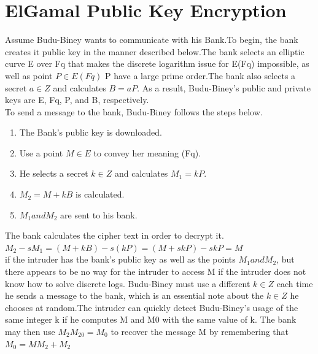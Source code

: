 \section{ElGamal Public Key Encryption}
Assume Budu-Biney wants to communicate with his Bank.To begin, the bank creates it public key in the manner described below.The bank selects an elliptic curve E over Fq that makes the discrete logarithm issue for E(Fq) impossible, as well as  point $P \in E(Fq)$ P have a large prime order.The bank also selects a secret $a \in Z$ and calculates $B = aP$. As a result, Budu-Biney's public and private keys are E, Fq, P, and B, respectively.\\To send a message to the bank, Budu-Biney follows the steps below.
\begin{enumerate}
\item The Bank's public key is downloaded.
\item Use a point $M \in E$ to convey her meaning (Fq).
\item He selects a secret $k \in Z$ and calculates $M_{1} = kP$.
\item $M_{2} = M + kB$ is calculated.
\item $M_{1} and M_{2}$ are sent to his bank.
\end{enumerate}
The bank calculates the cipher text in order to decrypt it.
$M_{2}-sM_{1}=(M+kB)-s(kP)=(M+skP)-skP=M$\\
if the intruder has the bank's public key as well as the points $M_{1} and M_{2}$, but there appears to be no way for the intruder to access M  if the intruder  does not know how to solve discrete logs. Budu-Biney must use a different $k \in Z$ each time he sends a message to the bank, which is an essential note about the $k \in Z$ he chooses at random.The intruder can quickly detect Budu-Biney's usage of the same integer k if he computes M and M0 with the same value of k. The bank may then use $M_{2}M_{20} = M_{0}$ to recover the message M by remembering that $M_{0} = M M_{2} + M_{2}$

